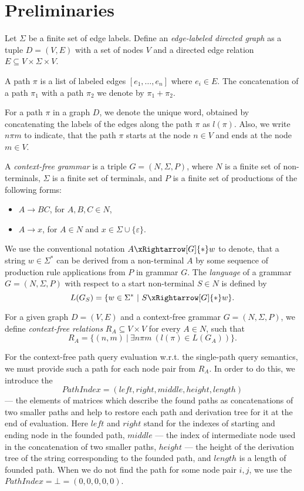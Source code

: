\section{Preliminaries}
\label{section_preliminaries}

Let $\Sigma$ be a finite set of edge labels. Define an \emph{edge-labeled directed graph} as a tuple \mbox{$D = (V, E)$} with a set of nodes $V$ and a directed edge relation \mbox{$E \subseteq V \times \Sigma \times V$}.

A path $\pi$ is a list of labeled edges $[e_1,\ldots,e_n]$ where $e_i \in E$. The concatenation of a path $\pi_1$ with a path $\pi_2$ we denote by $\pi_1 + \pi_2$.

For a path $\pi$ in a graph $D$, we denote the unique word, obtained by concatenating the labels of the edges along the path $\pi$ as \mbox{$l(\pi)$}. Also, we write \mbox{$n \pi m$} to indicate, that the path $\pi$ starts at the node \mbox{$n \in V$} and ends at the node \mbox{$m \in V$}.

A \emph{context-free grammar} is a triple \mbox{$G = (N, \Sigma, P)$}, where $N$ is a finite set of non-terminals, $\Sigma$ is a finite set of terminals, and $P$ is a finite set of productions of the following forms:

\begin{itemize}
    \item $A \rightarrow B C$, for $A,B,C \in N$,
    \item $A \rightarrow x$, for $A \in N$ and $x \in \Sigma \cup \{\varepsilon\}$.   
\end{itemize}

We use the conventional notation \mbox{$A \xRightarrow[G]{*} w$} to denote, that a string \mbox{$w \in \Sigma^*$} can be derived from a non-terminal $A$ by some sequence of production rule applications from $P$ in grammar $G$. The \emph{language} of a grammar \mbox{$G = (N,\Sigma,P)$} with respect to a start non-terminal \mbox{$S \in N$} is defined by $$L(G_S) = \{w \in \Sigma^*~|~S \xRightarrow[G]{*} w\}.$$

For a given graph \mbox{$D = (V, E)$} and a context-free grammar $G = (N, \Sigma, P)$, we define \emph{context-free relations} \mbox{$R_A \subseteq V \times V$} for every \mbox{$A \in N$}, such that $$R_A = \{(n,m)~|~\exists n \pi m~(l(\pi) \in L(G_A))\}.$$

For the context-free path query evaluation w.r.t. the single-path query semantics, we must provide such a path for each node pair from $R_A$. In order to do this, we introduce the $$PathIndex = (left,right,middle,height,length)$$ --- the elements of matrices which describe the found paths as concatenations of two smaller paths and help to restore each path and derivation tree for it at the end of evaluation. Here $left$ and $right$ stand for the indexes of starting and ending node in the founded path, $middle$ --- the index of intermediate node used in the concatenation of two smaller paths, $height$ --- the height of the derivation tree of the string corresponding to the founded path, and $length$ is a length of founded path. When we do not find the path for some node pair $i,j$, we use the $PathIndex = \bot = (0,0,0,0,0)$.

